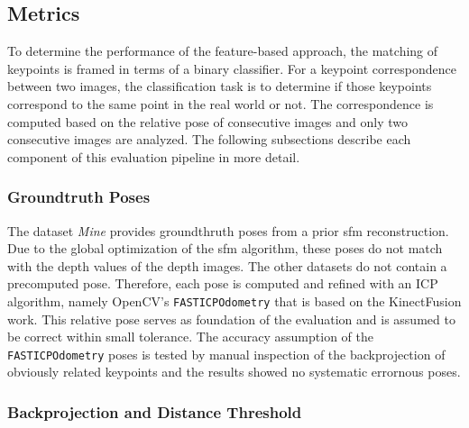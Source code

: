 \subsection{Metrics}

To determine the performance of the feature-based approach, the matching of keypoints is framed in terms of a binary classifier.
For a keypoint correspondence between two images, the classification task is to determine if those keypoints correspond to the same point in the real world or not.
The correspondence is computed based on the relative pose of consecutive images and only two consecutive images are analyzed.
The following subsections describe each component of this evaluation pipeline in more detail.

\subsubsection{Groundtruth Poses}

The dataset \emph{Mine} provides groundthruth poses from a prior \gls{sfm} reconstruction.
Due to the global optimization of the \gls{sfm} algorithm, these poses do not match with the depth values of the depth images.
The other datasets do not contain a precomputed pose.
Therefore, each pose is computed and refined with an ICP algorithm, namely OpenCV's \texttt{FASTICPOdometry} that is based on the KinectFusion\cite{newcombe_ismar2011} work.
This relative pose serves as foundation of the evaluation and is assumed to be correct within small tolerance.
The accuracy assumption of the \texttt{FASTICPOdometry} poses is tested by manual inspection of the backprojection of obviously related keypoints and the results showed no systematic errornous poses.

\subsubsection{Backprojection and Distance Threshold}


